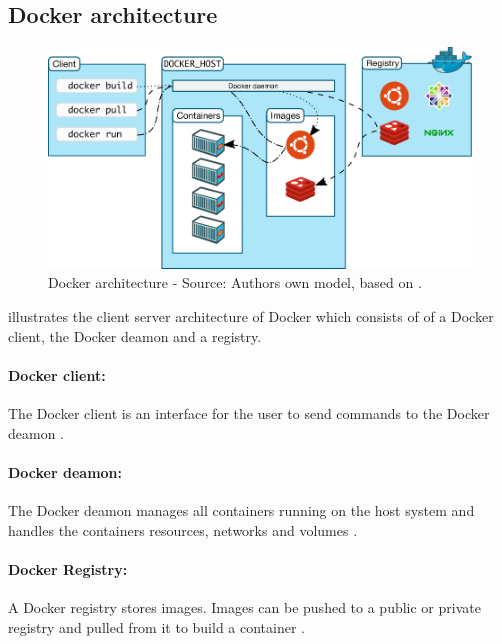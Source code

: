 \subsection{Docker architecture}

\begin{figure}[h]%
\centering
\includegraphics[scale=0.5]{images/03_background/docker_architecture}%
\caption{Docker architecture - Source: Authors own model, based on \cite{Docker2020Docs}.}%
\label{fig:spark_docker_architecture}%
\end{figure}

 illustrates the client server architecture of Docker which consists of of a Docker client, the Docker deamon and a registry.


\paragraph{Docker client:} The Docker client is an interface for the user to send commands to the Docker deamon \cite{Docker2020Docs}.


\paragraph{Docker deamon:} The Docker deamon manages all containers running on the host system and handles the containers resources, networks and volumes \cite{Bullington2020Docker}.


\paragraph{Docker Registry:} A Docker registry stores images. Images can be pushed to a public or private registry and pulled from it to build a container \cite{Docker2020Docs}.


